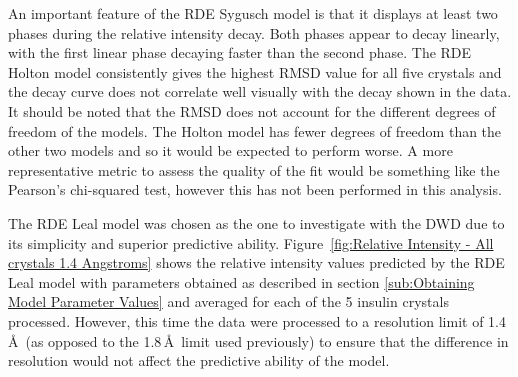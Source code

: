 An important feature of the RDE Sygusch model is that it displays at least two phases during the relative intensity decay.
Both phases appear to decay linearly, with the first linear phase decaying faster than the second phase.
The RDE Holton model consistently gives the highest RMSD value for all five crystals and the decay curve does not correlate well visually with the decay shown in the data.
It should be noted that the RMSD does not account for the different degrees of freedom of the models.
The Holton model has fewer degrees of freedom than the other two models and so it would be expected to perform worse.
A more representative metric to assess the quality of the fit would be something like the Pearson's chi-squared test, however this has not been performed in this analysis.

The RDE Leal model was chosen as the one to investigate with the DWD due to its simplicity and superior predictive ability.
Figure~\ref{fig:Relative Intensity - All crystals 1.4 Angstroms} shows the relative intensity values predicted by the RDE Leal model with parameters obtained as described in section \ref{sub:Obtaining Model Parameter Values} and averaged for each of the 5 insulin crystals processed.
However, this time the data were processed to a resolution limit of 1.4\,\AA\ (as opposed to the 1.8$\,$\AA\ limit used previously) to ensure that the difference in resolution would not affect the predictive ability of the model.
